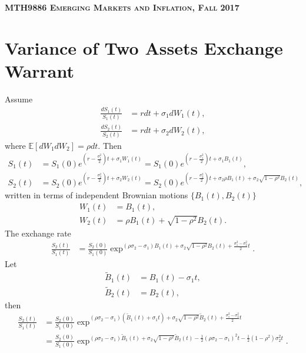 \documentclass[paper=a4, fontsize=10pt,]{scrartcl} %
\theoremstyle{theorem}
\theoremstyle{remark}
\theoremstyle{example}
\numberwithin{equation}{section} %
\numberwithin{figure}{section} %
\numberwithin{table}{section} %
\begin{document}
	
{
\begin{center}
\scshape{}\selectfont \textsc{\textbf{MTH9886 Emerging Markets and Inflation, \hspace{2mm}Fall 2017}}
\end{center}
}



\section{Variance of Two Assets Exchange Warrant}
Assume
\begin{align*}
\frac{dS_1(t)}{S_1(t)} &= rdt + \sigma_1 dW_1(t),\\
\frac{dS_2(t)}{S_2(t)} &= rdt + \sigma_2 dW_2(t),
\end{align*}
where $\mathbb{E}[dW_1 dW_2] = \rho dt$. Then
\begin{align*}
S_1(t) &= S_1(0)e^{\left(r - \frac{\sigma_1^2}{2}\right)t + \sigma_1 W_1(t)} = S_1(0)e^{\left(r - \frac{\sigma_1^2}{2}\right)t + \sigma_1 B_1(t)},\\
S_2(t) &= S_2(0)e^{\left(r - \frac{\sigma_2^2}{2}\right)t + \sigma_2 W_2(t)} = S_2(0)e^{\left(r - \frac{\sigma_2^2}{2}\right)t + \sigma_2 \rho B_1(t) + \sigma_2 \sqrt{1-\rho^2} B_2(t) },
\end{align*}
written in terms of independent Brownian motions $\{B_1(t),B_2(t)\}$
\begin{align*}
W_1(t) &= B_1(t),\\
W_2(t) &= \rho B_1(t) + \sqrt{1-\rho^2} B_2(t).
\end{align*}
The exchange rate
\begin{align*}
\frac{S_2(t)}{S_1(t)} &= \frac{S_2(0)}{S_1(0)}\exp^{ ( \rho \sigma_2 - \sigma_1)B_1(t) + \sigma_2 \sqrt{1-\rho^2} B_2(t) + \frac{\sigma_1^2 - \sigma_2^2}{2}t}.
\end{align*}
Let
\begin{align*}
\tilde{B}_1(t) &= B_1(t) - \sigma_1 t,\\
\tilde{B}_2(t) &= B_2(t),
\end{align*}
then
\begin{align*}
\frac{S_2(t)}{S_1(t)} &= \frac{S_2(0)}{S_1(0)}\exp^{ (\rho \sigma_2 - \sigma_1)(\tilde{B}_1(t) +\sigma_1 t) + \sigma_2 \sqrt{1-\rho^2} \tilde{B}_2(t) + \frac{\sigma_1^2 - \sigma_2^2}{2}t} \\
&= \frac{S_2(0)}{S_1(0)}\exp^{ (\rho \sigma_2 - \sigma_1)\tilde{B}_1(t) + \sigma_2 \sqrt{1-\rho^2} \tilde{B}_2(t) -\frac{1}{2}(\rho \sigma_2 - \sigma_1)^2 t -\frac{1}{2}(1-\rho^2)\sigma_2^2 t}.
\end{align*}
\end{document}
